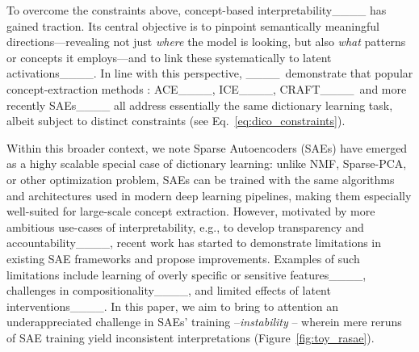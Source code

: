 To overcome the constraints above, concept-based interpretability____ has gained traction. Its central objective is to pinpoint semantically meaningful directions---revealing not just \emph{where} the model is looking, but also \emph{what} patterns or concepts it employs---and to link these systematically to latent activations____. 
In line with this perspective, ____~demonstrate that popular concept-extraction methods : ACE____, ICE____, CRAFT____~and more recently SAEs____ all address essentially the same dictionary learning task, albeit subject to distinct constraints (see Eq.~\ref{eq:dico_constraints}). 

Within this broader context, we note Sparse Autoencoders (SAEs) have emerged as a highy scalable special case of dictionary learning: unlike NMF, Sparse-PCA, or other optimization problem, SAEs can be trained with the same algorithms and architectures used in modern deep learning pipelines, making them especially well-suited for large-scale concept extraction. 
However, motivated by more ambitious use-cases of interpretability, e.g., to develop transparency and accountability____, recent work has started to demonstrate limitations in existing SAE frameworks and propose improvements. Examples of such limitations include learning of overly specific or sensitive features____, challenges in compositionality____, and limited effects of latent interventions____.
In this paper, we aim to bring to attention an underappreciated challenge in SAEs' training --\textit{instability} -- wherein mere reruns of SAE training yield inconsistent interpretations (Figure~\ref{fig:toy_rasae}).